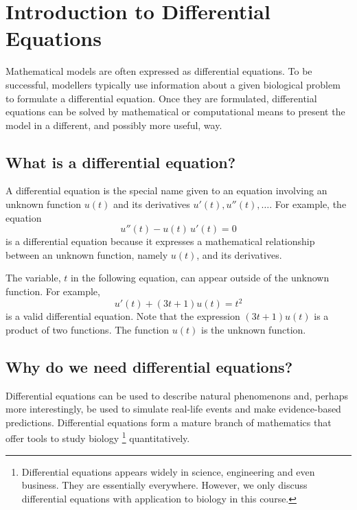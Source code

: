 \documentclass[../book.tex]{subfiles}
\begin{document}
\chapter{Introduction to Differential Equations}\label{ch:de}

Mathematical models are often expressed as differential equations. To be successful, modellers typically use information about a given biological problem to formulate a differential equation. Once they are formulated, differential equations can be solved by mathematical or computational means to present the model in a different, and possibly more useful, way.

\section{What is a differential equation?}
A differential equation is the special name given to an equation involving an unknown function \(u(t)\) and its derivatives \(u'(t), u''(t), \ldots\).
For example, the equation
\begin{equation}\label{eq:de-1}
u''(t) - u(t)\, u'(t) = 0
\end{equation}
is a differential equation because it expresses a mathematical relationship between an unknown function, namely \(u(t)\), and its derivatives.

The variable, \(t\) in the following equation, can appear outside of the unknown function. For example,
\begin{equation}\label{eq:de-2}
u'(t) + (3t + 1) u(t) = t^{2}
\end{equation}
is a valid differential equation. Note that the expression \((3t + 1)u(t)\) is a product of two functions. The function \(u(t)\) is the unknown function.

\section{Why do we need differential equations?}

Differential equations can be used to describe natural phenomenons and, perhaps more interestingly, be used to simulate real-life events and make evidence-based predictions.  Differential equations form a mature branch of mathematics that offer tools to study biology \footnote{Differential equations appears widely in science, engineering and even business. They are essentially everywhere. However, we only discuss differential equations with application to biology in this course.} quantitatively.
\end{document}
